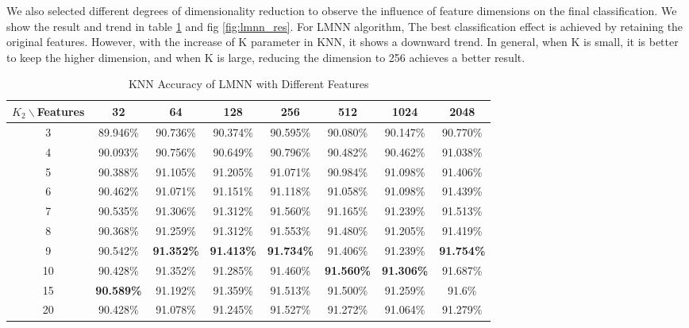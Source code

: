 We also selected different degrees of dimensionality reduction to observe the influence of feature dimensions on the final classification. We show the result and trend in table \ref{tab:lmnn} and fig \ref{fig:lmnn_res}. For LMNN algorithm, The best classification effect is achieved by retaining the original features. However, with the increase of K parameter in KNN, it shows a downward trend. In general, when K is small, it is better to keep the higher dimension, and when K is large, reducing the dimension to 256 achieves a better result.


\begin{table}[htbp]
\centering
\caption{KNN Accuracy of LMNN with Different Features}
\begin{tabular}{@{}cccccccc@{}}
\toprule
$K_2 \backslash $Features & 32 & 64 & 128 & 256 & 512 & 1024 & 2048 \\ \midrule
3 & 89.946\% & 90.736\% & 90.374\% & 90.595\% & 90.080\% & 90.147\% & 90.770\% \\
4 & 90.093\% & 90.756\% & 90.649\% & 90.796\% & 90.482\% & 90.462\% & 91.038\% \\
5 & 90.388\% & 91.105\% & 91.205\% & 91.071\% & 90.984\% & 91.098\% & 91.406\% \\
6 & 90.462\% & 91.071\% & 91.151\% & 91.118\% & 91.058\% & 91.098\% & 91.439\% \\
7 & 90.535\% & 91.306\% & 91.312\% & 91.560\% & 91.165\% & 91.239\% & 91.513\% \\
8 & 90.368\% & 91.259\% & 91.312\% & 91.553\% & 91.480\% & 91.205\% & 91.419\% \\
9 & 90.542\% & \textbf{91.352\%} & \textbf{91.413\%} & \textbf{91.734\%} & 91.406\% & 91.239\% & \textbf{91.754\%} \\
10 & 90.428\% & 91.352\% & 91.285\% & 91.460\% & \textbf{91.560\%} & \textbf{91.306\%} & 91.687\% \\
15 & \textbf{90.589\%} & 91.192\% & 91.359\% & 91.513\% & 91.500\% & 91.259\% & 91.6\% \\
20 & 90.428\% & 91.078\% & 91.245\% & 91.527\% & 91.272\% & 91.064\% & 91.279\% \\
\bottomrule
\end{tabular}
\label{tab:lmnn}
\end{table}


